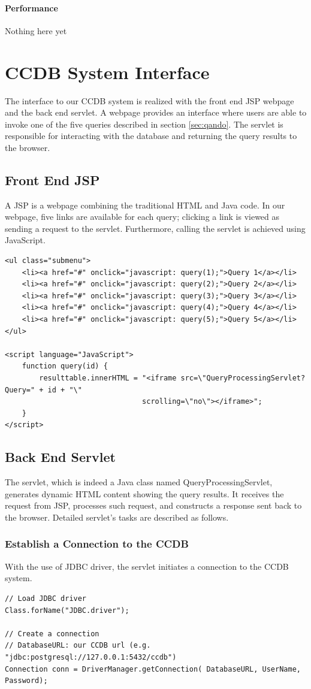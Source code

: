 \documentclass[11pt]{article}
\begin{document}
\paragraph{Performance} Nothing here yet

\section{CCDB System Interface}
The interface to our CCDB system is realized with the front end JSP webpage and the back end servlet. A webpage provides an interface where users are able to invoke one of the five queries described in section \ref{sec:qando}. The servlet is responsible for interacting with the database and returning the query results to the browser.
\subsection{Front End JSP}
A JSP is a webpage combining the traditional HTML and Java code. In our webpage, five links are available for each query; clicking a link is viewed as sending a request to the servlet. Furthermore, calling the servlet is achieved using JavaScript.
\begin{verbatim}
<ul class="submenu">
    <li><a href="#" onclick="javascript: query(1);">Query 1</a></li>
    <li><a href="#" onclick="javascript: query(2);">Query 2</a></li>
    <li><a href="#" onclick="javascript: query(3);">Query 3</a></li>
    <li><a href="#" onclick="javascript: query(4);">Query 4</a></li>
    <li><a href="#" onclick="javascript: query(5);">Query 5</a></li>
</ul>

<script language="JavaScript">
    function query(id) {
        resulttable.innerHTML = "<iframe src=\"QueryProcessingServlet?Query=" + id + "\"
                                scrolling=\"no\"></iframe>";
    }
</script>
\end{verbatim}

\subsection{Back End Servlet}
The servlet, which is indeed a Java class named QueryProcessingServlet, generates dynamic HTML content showing the query results. It receives the request from JSP, processes such request, and constructs a response sent back to the browser. Detailed servlet's tasks are described as follows.

\subsubsection{Establish a Connection to the CCDB}
With the use of JDBC driver, the servlet initiates a connection to the CCDB system.
\begin{verbatim}
// Load JDBC driver
Class.forName("JDBC.driver");

// Create a connection
// DatabaseURL: our CCDB url (e.g. "jdbc:postgresql://127.0.0.1:5432/ccdb")
Connection conn = DriverManager.getConnection( DatabaseURL, UserName, Password);
\end{verbatim}
\end{document}
